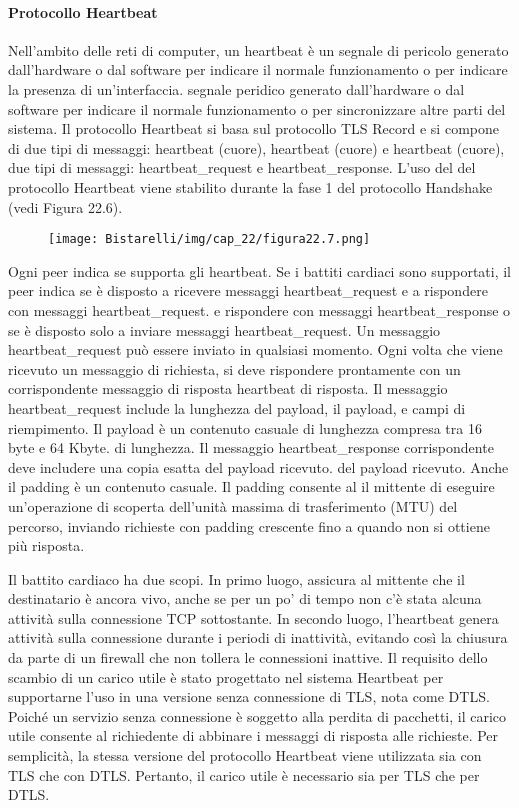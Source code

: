 \paragraph{Protocollo Heartbeat} Nell'ambito delle reti di computer, un heartbeat è un segnale di pericolo generato dall'hardware o dal software per indicare il normale funzionamento o per indicare la presenza di un'interfaccia.
segnale peridico generato dall'hardware o dal software per indicare il normale funzionamento o per sincronizzare altre parti del sistema. Il protocollo Heartbeat si basa sul protocollo TLS Record e si compone di due tipi di messaggi: heartbeat (cuore), heartbeat (cuore) e heartbeat (cuore), due tipi di messaggi: heartbeat\_request e heartbeat\_response. L'uso del del protocollo Heartbeat viene stabilito durante la fase 1 del protocollo Handshake (vedi Figura 22.6). 

\begin{figure}[H]
	\centering
    \texttt{[image: Bistarelli/img/cap\_22/figura22.7.png]}
\end{figure}

Ogni peer indica se supporta gli heartbeat. Se i battiti cardiaci sono supportati, il peer indica se è disposto a ricevere messaggi heartbeat\_request e a rispondere con messaggi heartbeat\_request. e rispondere con messaggi heartbeat\_response o se è disposto solo a inviare messaggi heartbeat\_request. Un messaggio heartbeat\_request può essere inviato in qualsiasi momento. Ogni volta che viene ricevuto un messaggio di richiesta, si deve rispondere prontamente con un corrispondente messaggio di risposta heartbeat di risposta. Il messaggio heartbeat\_request include la lunghezza del payload, il payload, e campi di riempimento. Il payload è un contenuto casuale di lunghezza compresa tra 16 byte e 64 Kbyte. di lunghezza. Il messaggio heartbeat\_response corrispondente deve includere una copia esatta del payload ricevuto. del payload ricevuto. Anche il padding è un contenuto casuale. Il padding consente al il mittente di eseguire un'operazione di scoperta dell'unità massima di trasferimento (MTU) del percorso, inviando richieste con padding crescente fino a quando non si ottiene più risposta. 

\singlespacing

Il battito cardiaco ha due scopi. In primo luogo, assicura al mittente che il destinatario è ancora vivo, anche se per un po' di tempo non c'è stata alcuna attività sulla connessione TCP sottostante. In secondo luogo, l'heartbeat genera attività sulla connessione durante i periodi di inattività, evitando così la chiusura da parte di un firewall che non tollera le connessioni inattive. Il requisito dello scambio di un carico utile è stato progettato nel sistema Heartbeat
per supportarne l'uso in una versione senza connessione di TLS, nota come DTLS. Poiché un servizio senza connessione è soggetto alla perdita di pacchetti, il carico utile consente al richiedente di abbinare i messaggi di risposta alle richieste. Per semplicità, la stessa versione del protocollo Heartbeat viene utilizzata sia con TLS che con DTLS. Pertanto, il carico utile è necessario sia per TLS che per DTLS.

